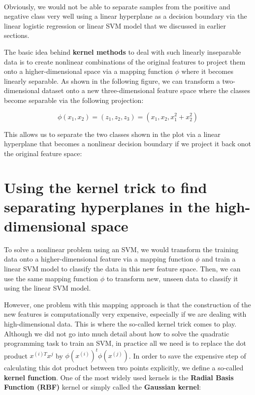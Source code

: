 \documentclass[11pt]{article}
\begin{document}
    \begin{center}
    \end{center}
    { \hspace*{\fill} \\}
    
    Obviously, we would not be able to separate samples from the positive
and negative class very well using a linear hyperplane as a decision
boundary via the linear logistic regression or linear SVM model that we
discussed in earlier sections.

The basic idea behind \textbf{kernel methods} to deal with such linearly
inseparable data is to create nonlinear combinations of the original
features to project them onto a higher-dimensional space via a mapping
function \(\phi\) where it becomes linearly separable. As shown in the
following figure, we can transform a two-dimensional dataset onto a new
three-dimensional feature space where the classes become separable via
the following projection:

\[\phi(x_1, x_2) = (z_1, z_2, z_3) = (x_1, x_2, x_1^2 + x_2^2)\]

This allows us to separate the two classes shown in the plot via a
linear hyperplane that becomes a nonlinear decision boundary if we
project it back onot the original feature space:

    \section{Using the kernel trick to find separating hyperplanes in the
high-dimensional
space}\label{using-the-kernel-trick-to-find-separating-hyperplanes-in-the-high-dimensional-space}

    To solve a nonlinear problem using an SVM, we would transform the
training data onto a higher-dimensional feature via a mapping function
\(\phi\) and train a linear SVM model to classify the data in this new
feature space. Then, we can use the same mapping function \(\phi\) to
transform new, unseen data to classify it using the linear SVM model.

However, one problem with this mapping approach is that the construction
of the new features is computationally very expensive, especially if we
are dealing with high-dimensional data. This is where the so-called
kernel trick comes to play. Although we did not go into much detail
about how to solve the quadratic programming task to train an SVM, in
practice all we need is to replace the dot product \(x^{(i)T}x^j\) by
\(\phi(x^{(i)})^t \phi(x^{(j)})\). In order to save the expensive step
of calculating this dot product between two points explicitly, we define
a so-called \textbf{kernel function}. One of the most widely used
kernels is the \textbf{Radial Basis Function (RBF)} kernel or simply
called the \textbf{Gaussian kernel}:
\end{document}
